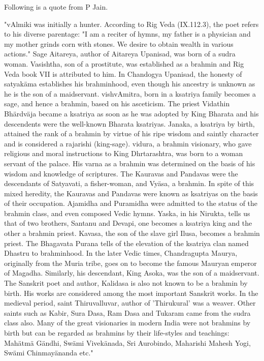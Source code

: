 \documentclass[oneside, article]{memoir}
\begin{document}
Following is a quote from P Jain.

"vAlmiki was initially a hunter.  According to Rig Veda (IX.112.3), the poet refers to his diverse parentage: "I am a reciter of hymns, my father is a physician and my mother grinds corn with stones. We desire to obtain wealth in various actions." Sage Aitareya, author of Aitareya Upanisad, was born of a sudra woman. Vasishtha, son of a prostitute, was established as a brahmin and Rig Veda book VII is attributed to him. In Chandogya Upanisad, the honesty of satyakäma establishes his brahminhood, even though his ancestry is unknown as he is the son of a maidservant. vishvAmitra, born in a ksatriya family becomes a sage, and hence a brahmin, based on his asceticism. The priest Vidathin Bhärdväja became a ksatriya as soon as he was adopted by King Bharata and his descendents were the well-known Bharata ksatriyas. Janaka, a ksatriya by birth, attained the rank of a brahmin by virtue of his ripe wisdom and saintly character and is considered a rajarishi (king-sage). vidura, a brahmin visionary, who gave religious and moral instructions to King Dhrtarashtra, was born to a woman servant of the palace. His varna as a brahmin was determined on the basis of his wisdom and knowledge of scriptures. The Kauravas and Pandavas were the descendants of Satyavati, a fisher-woman, and Vyäsa, a brahmin. In spite of this mixed heredity, the Kauravas and Pandavas were known as ksatriyas on the basis of their occupation. Ajamidha and Puramidha were admitted to the status of the brahmin class, and even composed Vedic hymns. Yaska, in his Nirukta, tells us that of two brothers, Santanu and Devapi, one becomes a ksatriya king and the other a brahmin priest. Kavasa, the son of the slave girl Ilusa, becomes a brahmin priest. The Bhagavata Purana tells of the elevation of the ksatriya clan named Dhastru to brahminhood. In the later Vedic times, Chandragupta Maurya, originally from the Muria tribe, goes on to become the famous Mauryan emperor of Magadha. Similarly, his descendant, King Asoka, was the son of a maidservant. The Sanskrit poet and author, Kalidasa is also not known to be a brahmin by birth. His works are considered among the most important Sanskrit works. In the medieval period, saint Thiruvalluvar, author of 'Thirukural' was a weaver. Other saints such as Kabir, Sura Dasa, Ram Dasa and Tukaram came from the sudra class also. Many of the great visionaries in modern India were not brahmins by birth but can be regarded as brahmins by their life-styles and teachings: Mahätmä Gändhi, Swämi Vivekänada, Sri Aurobindo, Maharishi Mahesh Yogi, Swämi Chinmayänanda etc."
\end{document}
